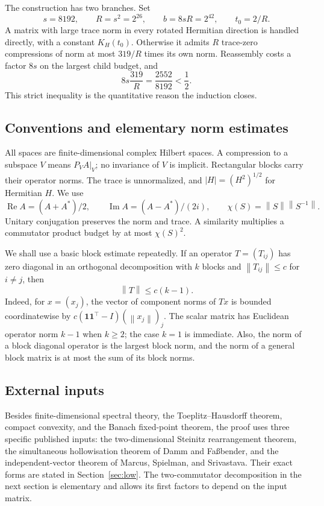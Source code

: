 \documentclass[11pt]{article}
\theoremstyle{remark}
\newcommand{\Rea}{\operatorname{Re}}
\newcommand{\Ima}{\operatorname{Im}}
\newcommand{\norm}[1]{\left\lVert#1\right\rVert}
\numberwithin{equation}{section}
\begin{document}
The construction has two branches. Set
\begin{equation}\label{eq:globalparameters}
 s=8192,\qquad R=s^2=2^{26},\qquad b=8sR=2^{42},\qquad t_0=2/R.
\end{equation}
A matrix with large trace norm in every rotated Hermitian direction is handled
directly, with a constant $K_H(t_0)$. Otherwise it admits $R$ trace-zero
compressions of norm at most $319/R$ times its own norm. Reassembly costs a factor
$8s$ on the largest child budget, and
\[
 8s\frac{319}{R}=\frac{2552}{8192}<\frac12.
\]
This strict inequality is the quantitative reason the induction closes.

\subsection{Conventions and elementary norm estimates}
All spaces are finite-dimensional complex Hilbert spaces. A compression to a
subspace $V$ means $P_VA|_V$; no invariance of $V$ is implicit. Rectangular blocks
carry their operator norms. The trace is unnormalized, and
$|H|=(H^2)^{1/2}$ for Hermitian $H$. We use
\[
 \Rea A=(A+A^*)/2,\qquad \Ima A=(A-A^*)/(2i),
 \qquad \chi(S)=\norm S\norm{S^{-1}}.
\]
Unitary conjugation preserves the norm and trace. A similarity multiplies a
commutator product budget by at most $\chi(S)^2$.

We shall use a basic block estimate repeatedly. If an operator $T=(T_{ij})$ has
zero diagonal in an orthogonal decomposition with $k$ blocks and
$\norm{T_{ij}}\le c$ for $i\ne j$, then
\begin{equation}\label{eq:offnorm}
 \norm T\le c(k-1).
\end{equation}
Indeed, for $x=(x_j)$, the vector of component norms of $Tx$ is bounded
coordinatewise by $c(\mathbf1\mathbf1^\top-I)(\norm{x_j})_j$. The scalar matrix
has Euclidean operator norm $k-1$ when $k\ge2$; the case $k=1$ is immediate.
Also, the norm of a block diagonal operator is the largest block norm, and the
norm of a general block matrix is at most the sum of its block norms.

\subsection{External inputs}
Besides finite-dimensional spectral theory, the Toeplitz--Hausdorff theorem,
compact convexity, and the Banach fixed-point theorem, the proof uses three
specific published inputs: the two-dimensional Steinitz rearrangement theorem,
the simultaneous hollowisation theorem of Damm and Fa\ss bender, and the
independent-vector theorem of Marcus, Spielman, and Srivastava. Their exact
forms are stated in Section~\ref{sec:low}.
The two-commutator decomposition in the next section is elementary and allows
its first factors to depend on the input matrix.
\end{document}
